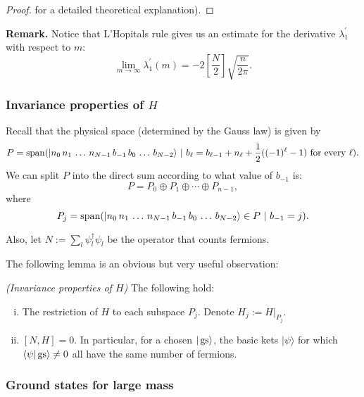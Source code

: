 \begin{proof}
{} for a detailed theoretical explanation).
\end{proof}
\noindent \textbf{Remark.} Notice that L'Hopitals rule gives us an estimate for the derivative $\lambda_1^\prime$ with respect to $m$:
\[
\lim_{m \rightarrow \infty} \lambda_1^\prime(m) = -2\left[\frac{N}{2}\right] \sqrt{\frac{n}{2\pi}}.
\]

\subsubsection{Invariance properties of $H$}
Recall that the physical space (determined by the Gauss law) is given by
	\[
	P = \operatorname{span} ( |n_0\, n_1\, \ldots \, n_{N-1} \, b_{-1}\, b_0\, \ldots\, b_{N-2}\rangle \ | \ b_{\ell} =b_{\ell-1} + n_{\ell} + \frac{1}{2}((-1)^\ell-1) \ \text{for every} \ \ell).
	\]
	We can split $P$ into the direct sum according to what value of $b_{-1}$ is:
	\[
	P = P_0 \oplus P_1 \oplus \cdots \oplus P_{n-1},
	\]
	where
	\[
	P_j = \operatorname{span}( |n_0\, n_1\, \ldots \, n_{N-1} \, b_{-1}\, b_0\, \ldots\, b_{N-2}\rangle \in P \ | \ b_{-1} = j).
	\]

Also, let $N:= \sum_{l} \psi_l^\dagger \psi_l$ be the operator that counts fermions.

The following lemma is an obvious but very useful observation:

\begin{lemma}\emph{(Invariance properties of $H$)} The following hold:
\begin{enumerate}[(i)]
\item The restriction of $H$ to each subspace $P_j$. Denote $H_j := H|_{P_j}$.
\item $[N,H] = 0$. In particular, for a chosen $|\operatorname{gs}\rangle$, the basic kets $|\psi\rangle$ for which $\langle \psi | \operatorname{gs} \rangle \neq 0$ all have the same number of fermions.
\end{enumerate}
\end{lemma}

\subsubsection{Ground states for large mass}

